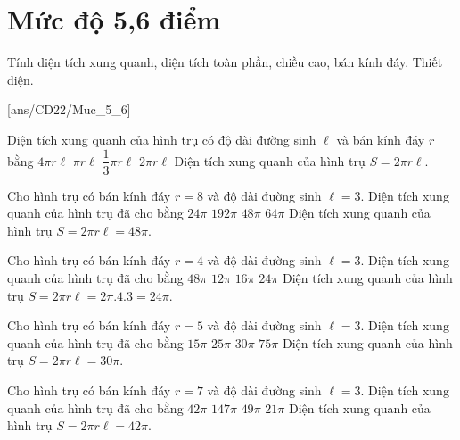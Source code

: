 \section{Mức độ 5,6 điểm}
\begin{dang}{Tính diện tích xung quanh, diện tích toàn phần, chiều cao, bán kính đáy. Thiết diện.}
\end{dang}
[ans/CD22/Muc_5_6]
\begin{ex}%
	Diện tích xung quanh của hình trụ có độ dài đường sinh $\ell$ và bán kính đáy $r$ bằng
	\choice
	{$4\pi r\ell$}
	{$\pi r\ell$}
	{$\dfrac{1}{3}\pi r\ell$}
	{\True $2\pi r\ell$}
	\loigiai
	{Diện tích xung quanh của hình trụ $S=2\pi r\ell$.}
\end{ex}
\begin{ex}%
	Cho hình trụ có bán kính đáy $r=8$ và độ dài đường sinh $\ell=3$. Diện tích xung quanh của hình trụ đã cho bằng
	\choice
	{$24\pi$}
	{$192\pi$}
	{\True $48\pi$}
	{$64\pi$}
	\loigiai
	{Diện tích xung quanh của hình trụ $S=2\pi r\ell=48\pi$.}
\end{ex}
\begin{ex}%
	Cho hình trụ có bán kính đáy $r=4$ và độ dài đường sinh $\ell=3$. Diện tích xung quanh của hình trụ đã cho bằng
	\choice
	{$48\pi$}
	{$12\pi$}
	{$16\pi$}
	{\True $24\pi$}
	\loigiai
	{Diện tích xung quanh của hình trụ $S=2\pi r\ell=2\pi.4.3=24\pi$.}
\end{ex}
\begin{ex}%
	Cho hình trụ có bán kính đáy $r=5$ và độ dài đường sinh $\ell=3$. Diện tích xung quanh của hình trụ đã cho bằng
	\choice
	{$15\pi$}
	{$25\pi$}
	{\True $30\pi$}
	{$75\pi$}
	\loigiai
	{Diện tích xung quanh của hình trụ $S=2\pi r\ell=30\pi$.}
\end{ex}
\begin{ex} %
	Cho hình trụ có bán kính đáy $r=7$ và độ dài đường sinh $\ell=3$. Diện tích xung quanh của hình trụ đã cho bằng
	\choice
	{\True $42\pi$}
	{$147\pi$}
	{$49\pi$}
	{$21\pi$}
	\loigiai
	{Diện tích xung quanh của hình trụ $S=2\pi r\ell=42\pi$.}
\end{ex}
